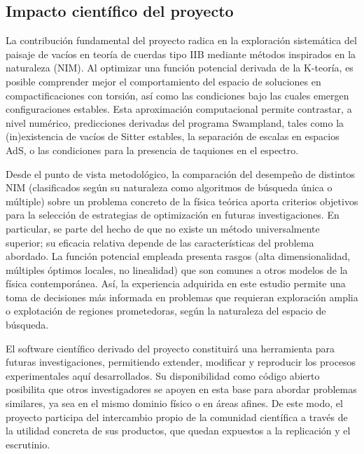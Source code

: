 \subsection{Impacto científico del proyecto}

La contribución fundamental del proyecto radica en la
exploración sistemática del paisaje de vacíos en teoría de
cuerdas tipo IIB mediante métodos inspirados en la naturaleza
(NIM). Al optimizar una función potencial derivada de la
K-teoría, es posible comprender mejor el comportamiento del
espacio de soluciones en compactificaciones con torsión, así
como las condiciones bajo las cuales emergen configuraciones
estables. Esta aproximación computacional permite contrastar,
a nivel numérico, predicciones derivadas del programa
Swampland, tales como la (in)existencia de vacíos de Sitter
estables, la separación de escalas en espacios AdS, o las
condiciones para la presencia de taquiones en el espectro.

Desde el punto de vista metodológico, la comparación del
desempeño de distintos NIM (clasificados según su naturaleza
como algoritmos de búsqueda única o múltiple) sobre un
problema concreto de la física teórica aporta criterios
objetivos para la selección de estrategias de optimización en
futuras investigaciones. En particular, se parte del hecho de
que no existe un método universalmente superior; su eficacia
relativa depende de las características del problema abordado.
La función potencial empleada presenta rasgos (alta
dimensionalidad, múltiples óptimos locales, no linealidad) que
son comunes a otros modelos de la física contemporánea. Así,
la experiencia adquirida en este estudio permite una toma de
decisiones más informada en problemas que requieran
exploración amplia o explotación de regiones prometedoras,
según la naturaleza del espacio de búsqueda.

El software científico derivado del proyecto constituirá una
herramienta para futuras investigaciones, permitiendo
extender, modificar y reproducir los procesos experimentales
aquí desarrollados. Su disponibilidad como código abierto
posibilita que otros investigadores se apoyen en esta base
para abordar problemas similares, ya sea en el mismo dominio
físico o en áreas afines. De este modo, el proyecto participa
del intercambio propio de la comunidad científica a través de
la utilidad concreta de sus productos, que quedan expuestos a
la replicación y el escrutinio.
